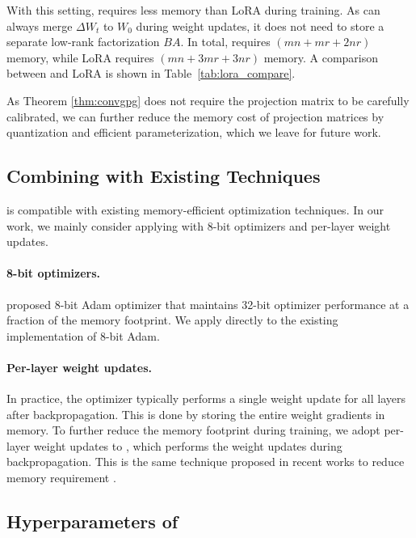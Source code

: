 With this setting, \lowrank{} requires less memory than LoRA during training.
As \lowrank{} can always merge $\Delta W_t$ to $W_0$ during weight updates, it does not need to store a separate low-rank factorization $BA$.
In total, \lowrank{} requires $(mn + mr + 2nr)$ memory, while LoRA requires $(mn + 3mr + 3nr)$ memory.
A comparison between \lowrank{} and LoRA is shown in Table~\ref{tab:lora_compare}.

As Theorem \ref{thm:convgpg} does not require the projection matrix to be carefully calibrated, we can further reduce the memory cost of projection matrices by quantization and efficient parameterization, which we leave for future work.

\subsection{Combining with Existing Techniques}

\lowrank{} is compatible with existing memory-efficient optimization techniques.
In our work, we mainly consider applying \lowrank{} with 8-bit optimizers and per-layer weight updates.

\paragraph{8-bit optimizers.}
\citet{dettmers8bitOptimizersBlockwise2021} proposed 8-bit Adam optimizer that maintains 32-bit optimizer performance at a fraction of the memory footprint.
We apply \lowrank{} directly to the existing implementation of 8-bit Adam.

\paragraph{Per-layer weight updates.}
In practice, the optimizer typically performs a single weight update for all layers after backpropagation. This is done by storing the entire weight gradients in memory. 
To further reduce the memory footprint during training, we adopt per-layer weight updates to \lowrank, which performs the weight updates during backpropagation. This is the same technique proposed in recent works to reduce memory requirement \citep{lvAdaLomoLowmemoryOptimization2023,lvFullParameterFinetuning2023}.



\subsection{Hyperparameters of \lowrank{}}
\label{sec:lowrank-hyperparams}


